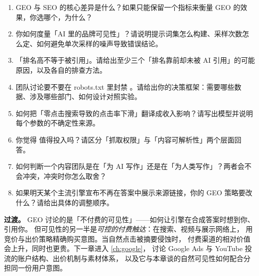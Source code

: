 \begin{interview}[本章对应的面试题]
\begin{enumerate}
  \item GEO 与 SEO 的核心差异是什么？如果只能保留一个指标来衡量 GEO 的效果，你选哪个，为什么？
  \item 你如何度量「AI 里的品牌可见性」？请说明提示词集怎么构建、采样次数怎么定、如何避免单次采样的噪声导致错误结论。
  \item 「排名高不等于被引用」。请给出至少三个「排名靠前却未被 AI 引用」的可能原因，以及各自的排查方法。
  \item 团队讨论要不要在 robots.txt 里封禁 。请给出你的决策框架：需要哪些数据、涉及哪些部门、如何设计对照实验。
  \item 如何把「零点击搜索导致的点击率下滑」翻译成收入影响？请写出模型并说明每个参数的不确定性来源。
  \item 你觉得  值得投入吗？请区分「抓取权限」与「内容可解析性」两个层面回答。
  \item 如何判断一个内容团队是在「为 AI 写作」还是在「为人类写作」？两者会不会冲突，冲突时你怎么取舍？
  \item 如果明天某个主流引擎宣布不再在答案中展示来源链接，你的 GEO 策略要改什么？请给出具体的调整顺序。
\end{enumerate}
\end{interview}

\noindent\textbf{过渡。}
GEO 讨论的是「不付费的可见性」——如何让引擎在合成答案时想到你、引用你。
但可见性的另一半是\emph{可控的付费触达}：在搜索、视频与展示网络上，
用竞价与出价策略精确购买意图。当自然点击被摘要侵蚀时，
付费渠道的相对价值会上升，同时也更贵。下一章进入 \cref{ch:google}，
讨论 Google Ads 与 YouTube 投流的账户结构、出价机制与素材体系，
以及它与本章谈的自然可见性如何配合分担同一份用户意图。
